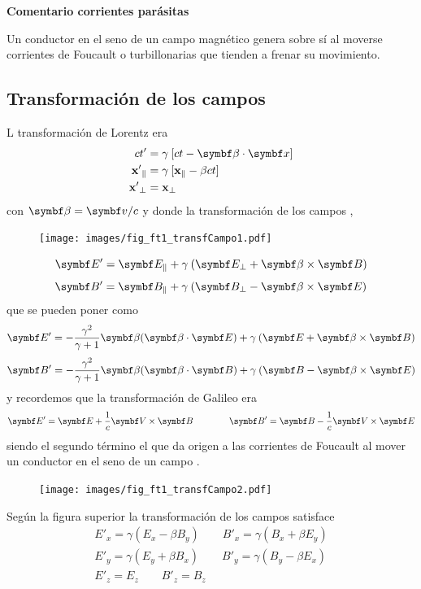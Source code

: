 \documentclass[10pt,oneside]{CBFT_book}
\begin{document}
\begin{ejemplo}{\bf Comentario corrientes parásitas}

Un conductor en el seno de un campo magnético genera sobre sí al moverse corrientes
de Foucault o turbillonarias que tienden a frenar su movimiento.
 
\end{ejemplo}


\subsection{Transformación de los campos}

L transformación de Lorentz era 
\begin{align*}
	ct' &= \gamma \: [ ct - \pe{\beta}{x} ] \\
	\mathbf{x'}_\parallel &= \gamma \: [ \mathbf{x}_\parallel - {\beta}ct ] \\
	\mathbf{x'}_\perp &= \mathbf{x}_\perp
\end{align*}
con $\vb{\beta} = \vb{v}/c$ y donde la transformación de los campos , 

\begin{figure}[htb]
	\begin{center}
	\texttt{[image: images/fig\_ft1\_transfCampo1.pdf]}	 
	\end{center}
	\caption{}
\end{figure} 

\[
	\vb{E}' = \vb{E}_\parallel + \gamma \: ( \vb{E}_\perp  + \pv{\beta}{B} )
\]
\[
	\vb{B}' = \vb{B}_\parallel + \gamma \: ( \vb{B}_\perp  - \pv{\beta}{E} )
\]
que se pueden poner como 
\[
	\vb{E}' = - \frac{ \gamma^2 }{ \gamma + 1 }\vb{\beta} (\pe{\beta}{E}) +
		\gamma \: ( \vb{E}  + \pv{\beta}{B} )
\]
\[
	\vb{B}' = - \frac{ \gamma^2 }{ \gamma + 1 }\vb{\beta} (\pe{\beta}{B}) + 
		\gamma \: ( \vb{B}  - \pv{\beta}{E} )
\]
y recordemos que la transformación de Galileo era
\[
	\vb{E}' = \vb{E} + \frac{1}{c} \pv{V}{B} \qquad \qquad 
	\vb{B}' = \vb{B} - \frac{1}{c} \pv{V}{E}
\]
siendo el segundo término el que da origen a las corrientes de Foucault al mover un conductor en el seno
de un campo .

\begin{figure}[htb]
	\begin{center}
	\texttt{[image: images/fig\_ft1\_transfCampo2.pdf]}	 
	\end{center}
	\caption{}
\end{figure} 

Según la figura superior la transformación de los campos satisface 
\begin{align*}
	E'_x = \gamma ( E_x - \beta B_y ) \qquad B'_x = \gamma ( B_x + \beta E_y ) \\
	E'_y = \gamma ( E_y + \beta B_x ) \qquad B'_y = \gamma ( B_y - \beta E_x ) \\
	E'_z = E_z \qquad B'_z = B_z 
\end{align*}
\end{document}
